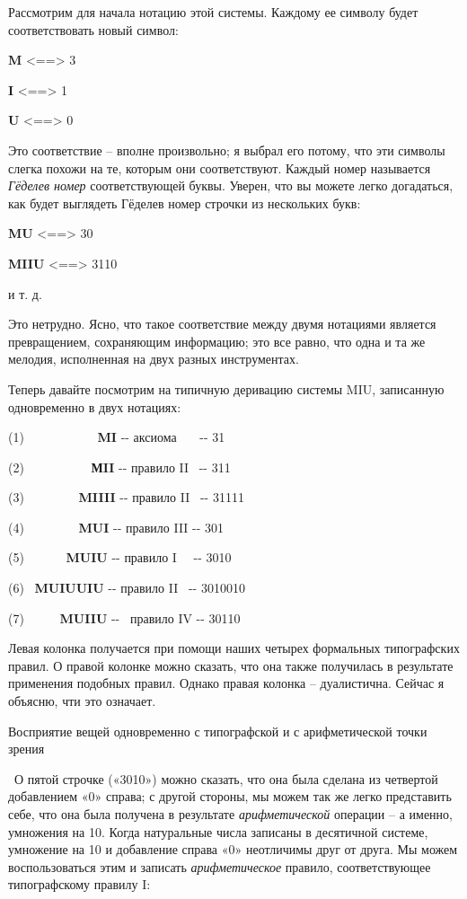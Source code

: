 \documentclass[../main.tex]{subfiles}
\begin{document}
Рассмотрим для начала нотацию этой системы. Каждому ее символу будет соответствовать новый символ:

\textbf{M} \textless==\textgreater{} 3

\textbf{I} \textless==\textgreater{} 1

\textbf{U} \textless==\textgreater{} 0

Это соответствие \--- вполне произвольно; я выбрал его потому, что эти символы слегка похожи на те, которым они соответствуют. Каждый номер называется \emph{Гёделев номер} соответствующей буквы. Уверен, что вы можете легко догадаться, как будет выглядеть Гёделев номер строчки из нескольких букв:

\textbf{MU} \textless==\textgreater{} 30

\textbf{MIIU} \textless==\textgreater{} 3110

и т. д.

Это нетрудно. Ясно, что такое соответствие между двумя нотациями является превращением, сохраняющим информацию; это все равно, что одна и та же мелодия, исполненная на двух разных инструментах.

Теперь давайте посмотрим на типичную деривацию системы MIU, записанную одновременно в двух нотациях:

(1)~~~~~~~~~~~ \textbf{MI} -\/- аксиома~~~ -\/- 31

(2)~~~~~~~~~~ \textbf{МII} -\/- правило II~ -\/- 311

(3)~~~~~~~~ \textbf{MIIII} -\/- правило II~ -\/- 31111

(4)~~~~~~~~ \textbf{MUI} -\/- правило III -\/- 301

(5)~~~~~~ \textbf{MUIU} -\/- правило I~~ -\/- 3010

(6)~ \textbf{MUIUUIU} -\/- правило II~ -\/- 3010010

(7)~~~~~ \textbf{MUIIU} -\/-~ правило IV -\/- 30110

Левая колонка получается при помощи наших четырех формальных типографских правил. О правой колонке можно сказать, что она также получилась в результате применения подобных правил. Однако правая колонка \--- дуалистична. Сейчас я объясню, чти это означает.

Восприятие вещей одновременно с типографской и с арифметической точки зрения

~О пятой строчке («3010») можно сказать, что она была сделана из четвертой добавлением «0» справа; с другой стороны, мы можем так же легко представить себе, что она была получена в результате \emph{арифметической} операции \--- а именно, умножения на 10. Когда натуральные числа записаны в десятичной системе, умножение на 10 и добавление справа «0» неотличимы друг от друга. Мы можем воспользоваться этим и записать \emph{арифметическое} правило, соответствующее типографскому правилу I:
\end{document}
